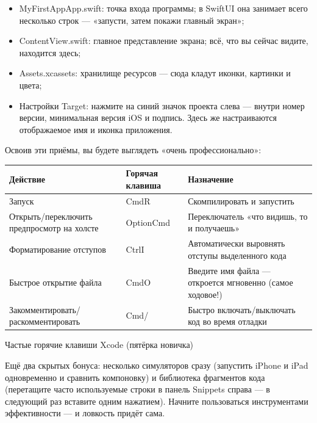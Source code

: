 \begin{itemize}
  \item MyFirstAppApp.swift: точка входа программы; в SwiftUI она занимает всего несколько строк — «запусти, затем покажи главный экран»;
  \item ContentView.swift: главное представление экрана; всё, что вы сейчас видите, находится здесь;
  \item Assets.xcassets: хранилище ресурсов — сюда кладут иконки, картинки и цвета;
  \item Настройки Target: нажмите на синий значок проекта слева — внутри номер версии, минимальная версия iOS и подпись. Здесь же настраиваются отображаемое имя и иконка приложения.
\end{itemize}



Освоив эти приёмы, вы будете выглядеть «очень профессионально»:

\begin{center}
\begin{tabularx}{\linewidth}{|X|X|X|}
\hline
\textbf{Действие} & \textbf{Горячая клавиша} & \textbf{Назначение} \tabularnewline
\hline
Запуск & CmdR & Скомпилировать и запустить \tabularnewline
Открыть/переключить предпросмотр на холсте & OptionCmd & Переключатель «что видишь, то и получаешь» \tabularnewline
Форматирование отступов & CtrlI & Автоматически выровнять отступы выделенного кода \tabularnewline
Быстрое открытие файла & CmdO & Введите имя файла — откроется мгновенно (самое ходовое!) \tabularnewline
Закомментировать/раскомментировать & Cmd/ & Быстро включать/выключать код во время отладки \tabularnewline
\hline
\end{tabularx}
\end{center}

\begin{center}\small\color{gray}Частые горячие клавиши Xcode (пятёрка новичка)\end{center}

Ещё два скрытых бонуса: несколько симуляторов сразу (запустить iPhone и iPad одновременно и сравнить компоновку) и библиотека фрагментов кода (перетащите часто используемые строки в панель Snippets справа — в следующий раз вставите одним нажатием). Начните пользоваться инструментами эффективности — и ловкость придёт сама.

